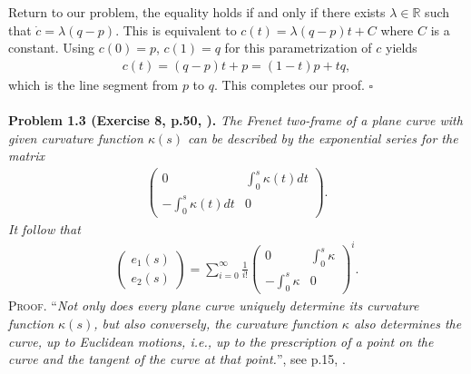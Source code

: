 \documentclass[a4paper]{article}
\numberwithin{equation}{section}
\begin{document}
Return to our problem, the equality holds if and only if there exists $\lambda \in \mathbb{R}$ such that $\dot c = \lambda \left( {q - p} \right)$. This is equivalent to $c\left(t\right) = \lambda \left( {q - p} \right)t + C$ where $C$ is a constant. Using $c\left(0\right)=p$, $c\left(1\right)=q$ for this parametrization of $c$ yields
\begin{align}
c\left( t \right) = \left( {q - p} \right)t + p = \left( {1 - t} \right)p + tq,
\end{align}
which is the line segment from $p$ to $q$. This completes our proof. \hfill $\square$\\
\\
\textbf{Problem 1.3 (Exercise 8, p.50, \cite{1}).} \textit{The Frenet two-frame of a plane curve with given curvature function $\kappa \left(s\right)$ can be described by the exponential series for the matrix}
\begin{align}
\left( {\begin{array}{*{20}{c}}
0&{\int_0^s {\kappa \left( t \right)dt} }\\
{ - \int_0^s {\kappa \left( t \right)dt} }&0
\end{array}} \right).
\end{align}
\textit{It follow that}
\begin{align}
\left( {\begin{array}{*{20}{c}}
{{e_1}\left( s \right)}\\
{{e_2}\left( s \right)}
\end{array}} \right) = \sum\limits_{i = 0}^\infty  {\frac{1}{{i!}}{{\left( {\begin{array}{*{20}{c}}
0&{\int_0^s \kappa  }\\
{ - \int_0^s \kappa  }&0
\end{array}} \right)}^i}} .
\end{align}
\textsc{Proof.} ``\textit{Not only does every plane curve uniquely determine its curvature function $\kappa \left(s\right)$, but also conversely, the curvature function $\kappa$ also determines the curve, up to Euclidean motions, i.e., up to the prescription of a point on the curve and the tangent of the curve at that point.}'', see p.15, \cite{1}. 
\end{document}
